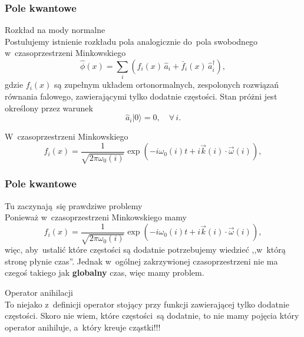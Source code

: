 \documentclass[10pt,t]{beamer}
\begin{document}
\begin{frame}
  \frametitle{Pole kwantowe}


  Rozkład na mody normalne \\
  Postulujemy istnienie rozkładu pola analogicznie do~pola
  swobodnego w~czasoprzestrzeni Minkowskiego
  \begin{equation}
    \label{eq:Promieniowanie-Hawkinga-05}
    \widehat{ \phi }( x ) =
    \sum_{ i }( f_{ i }( x )\, \widehat{ a }_{ i }
    + \bar{ f }_{ i }( x )\, \widehat{ a }^{ \dagger }_{ i } ),
  \end{equation}
  gdzie $f_{ i }( x )$ są zupełnym układem ortonormalnych,
  zespolonych rozwiązań równania falowego, zawierającymi tylko
  dodatnie częstości. Stan próżni jest określony przez warunek
  \begin{equation}
    \label{eq:Promieniowanie-Hawkinga-06}
    \widehat{ a }_{ i }| 0 \rangle = 0, \quad \forall\, i.
  \end{equation}

  W~czasoprzestrzeni Minkowskiego \\
  \begin{equation}
    \label{eq:Promieniowanie-Hawkinga-07}
    f_{ i }( x ) =
    \frac{ 1 }{ \sqrt{ 2\pi \omega_{ 0 }( i ) } }
    \exp( -i \omega_{ 0 }( i ) t + i \vec{ k }( i )
    \cdot \vec{ \omega }( i ) ),
  \end{equation}

\end{frame}





\begin{frame}
  \frametitle{Pole kwantowe}


  Tu zaczynają~się prawdziwe problemy \\
  Ponieważ w~czasoprzestrzeni Minkowskiego mamy
  \begin{equation}
    \label{eq:Promieniowanie-Hawkinga-08}
    f_{ i }( x ) =
    \frac{ 1 }{ \sqrt{ 2\pi \omega_{ 0 }( i ) } }
    \exp( -i \omega_{ 0 }( i ) t + i \vec{ k }( i )
    \cdot \vec{ \omega }( i ) ),
  \end{equation}
  więc, aby~ustalić które częstości są dodatnie potrzebujemy
  wiedzieć ,,w~którą stronę płynie czas''. Jednak w~ogólnej
  zakrzywionej czasoprzestrzeni nie ma czegoś takiego jak
  \textbf{globalny} czas, więc mamy problem.

  Operator anihilacji \\
  To niejako z~definicji operator stojący przy funkcji zawierającej
  tylko dodatnie częstości. Skoro nie wiem, które częstości~są
  dodatnie, to nie mamy pojęcia który operator anihiluje, a~który
  kreuje cząstki!!!

\end{frame}
\end{document}
